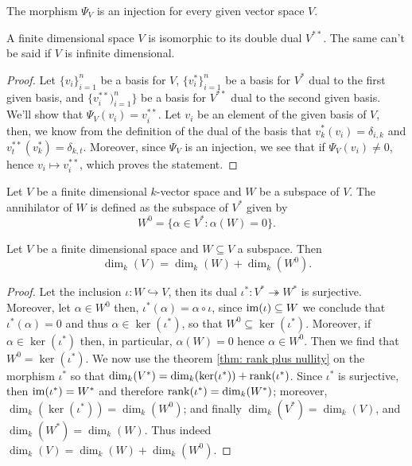 \begin{proposition}
  The morphism \(\Psi_V\) is an injection for every given vector space \(V\).
\end{proposition}

\begin{proposition}
  A finite dimensional space \(V\) is isomorphic to its double dual
  \(V^{\ast\ast}\). The same can't be said if \(V\) is infinite dimensional.
\end{proposition}

\begin{proof}
  Let \(\{v_i\}_{i=1}^n\) be a basis for \(V\), \(\{v_i^\ast\}_{i=1}^n\) be a
  basis for \(V^\ast\) dual to the first given basis, and
  \(\{v_i^{\ast\ast})_{i=1}^n\}\) be a basis for \(V^{\ast\ast}\) dual to the
  second given basis. We'll show that \(\Psi_V(v_i) = v_i^{\ast\ast}\). Let
  \(v_i\) be an element of the given basis of \(V\), then, we know from the
  definition of the dual of the basis that \(v_k^\ast(v_i) = \delta_{i, k}\) and
  \(v_t^{\ast\ast}(v_k^\ast) = \delta_{k, t}\).  Moreover, since \(\Psi_V\) is
  an injection, we see that if \(\Psi_V(v_i) \neq 0\), hence \(v_i \mapsto
  v_i^{\ast\ast}\), which proves the statement.
\end{proof}

\begin{definition}[Annihilator]\label{def: annihilator}
  Let \(V\) be a finite dimensional \(k\)-vector space and \(W\) be a subspace
  of \(V\). The annihilator of \(W\) is defined as the subspace of \(V^\ast\)
  given by
  \[
    W^0 = \{\alpha \in V^\ast : \alpha(W) = 0\}.
  \]
\end{definition}

\begin{proposition}
  Let \(V\) be a finite dimensional space and \(W \subseteq V\) a subspace. Then
  \[
    \dim_k(V) = \dim_k(W) + \dim_k(W^0).
  \]
\end{proposition}

\begin{proof}
  Let the inclusion \(\iota : W \hookrightarrow V\), then its dual \(\iota^\ast :
  V^\ast \twoheadrightarrow W^\ast\) is surjective. Moreover, let \(\alpha \in
  W^0\) then, \(\iota^\ast(\alpha) = \alpha \circ \iota\), since \(\operatorname{im}(\iota)
  \subseteq W\) we conclude that \(\iota^\ast(\alpha) = 0\) and thus \(\alpha
  \in \ker(\iota^\ast)\), so that \(W^0 \subseteq \ker(\iota^\ast)\). Moreover,
  if \(\alpha \in \ker(\iota^\ast)\) then, in particular, \(\alpha(W) = 0\)
  hence \(\alpha \in W^0\). Then we find that \(W^0 = \ker(\iota^\ast)\). We now
  use the theorem \ref{thm: rank plus nullity} on the morphism \(\iota^\ast\) so
  that \(\dim_k(V^\ast) = \dim_k(\ker(\iota^\ast)) + \operatorname{rank}(\iota^\ast)\). Since
  \(\iota^\ast\) is surjective, then \(\operatorname{im}(\iota^\ast) = W^\ast\) and therefore
  \(\operatorname{rank}(\iota^\ast) = \dim_k(W^\ast)\); moreover, \(\dim_k(\ker(\iota^\ast)) =
  \dim_k(W^0)\); and finally \(\dim_k(V^\ast) = \dim_k(V)\), and
  \(\dim_k(W^\ast) = \dim_k(W)\). Thus indeed \(\dim_k(V) = \dim_k(W) +
  \dim_k(W^0)\).
\end{proof}
